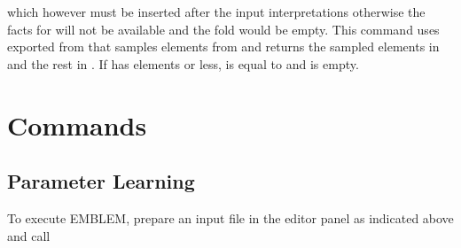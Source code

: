 \documentclass[letterpaper,10pt,english]{sphinxmanual}
\begin{document}
\begin{sphinxVerbatim}[commandchars=\\\{\}]
 
\end{sphinxVerbatim}

\sphinxAtStartPar
which however must be inserted after the input interpretations otherwise the facts for  will not be available and the fold  would be empty.
This command uses  exported from  that samples  elements from  and returns the sampled elements in  and the rest in .
If  has  elements or less,  is equal to  and  is empty.


\section{Commands}
\label{\detokenize{index:commands}}

\subsection{Parameter Learning}
\label{\detokenize{index:parameter-learning}}
\sphinxAtStartPar
To execute EMBLEM, prepare an input file in the editor panel as indicated above and call

\begin{sphinxVerbatim}[commandchars=\\\{\}]
   
\end{sphinxVerbatim}
\end{document}
